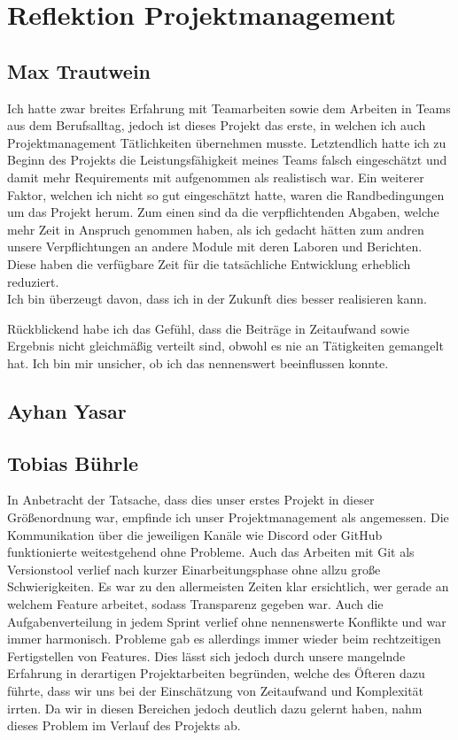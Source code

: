 \chapter{Reflektion Projektmanagement}\label{ch:reflektion-projektmanagement}


\section{Max Trautwein}

Ich hatte zwar breites Erfahrung mit Teamarbeiten sowie dem Arbeiten in Teams aus dem Berufsalltag,
jedoch ist dieses Projekt das erste, in welchen ich auch Projektmanagement Tätlichkeiten übernehmen musste.
Letztendlich hatte ich zu Beginn des Projekts die Leistungsfähigkeit meines Teams falsch eingeschätzt und
damit mehr Requirements mit aufgenommen als realistisch war.
Ein weiterer Faktor, welchen ich nicht so gut eingeschätzt hatte, waren die Randbedingungen um das Projekt herum.
Zum einen sind da die verpflichtenden Abgaben, welche mehr Zeit in Anspruch genommen haben, als ich gedacht hätten
zum andren unsere Verpflichtungen an andere Module mit deren Laboren und Berichten.
Diese haben die verfügbare Zeit für die tatsächliche Entwicklung erheblich reduziert.\\
Ich bin überzeugt davon, dass ich in der Zukunft dies besser realisieren kann.

Rückblickend habe ich das Gefühl, dass die Beiträge in Zeitaufwand sowie Ergebnis nicht gleichmäßig verteilt sind,
obwohl es nie an Tätigkeiten gemangelt hat.
Ich bin mir unsicher, ob ich das nennenswert beeinflussen konnte.

\section{Ayhan Yasar}


\section{Tobias Bührle}
In Anbetracht der Tatsache, dass dies unser erstes Projekt in dieser Größenordnung war,
empfinde ich unser Projektmanagement als angemessen. Die Kommunikation über die jeweiligen
Kanäle wie Discord oder GitHub funktionierte weitestgehend ohne Probleme. Auch das
Arbeiten mit Git als Versionstool verlief nach kurzer Einarbeitungsphase ohne allzu große
Schwierigkeiten. Es war zu den allermeisten Zeiten klar ersichtlich, wer gerade an welchem
Feature arbeitet, sodass Transparenz gegeben war. Auch die Aufgabenverteilung in jedem
Sprint verlief ohne nennenswerte Konflikte und war immer harmonisch. Probleme gab es
allerdings immer wieder beim rechtzeitigen Fertigstellen von Features. Dies lässt sich
jedoch durch unsere mangelnde Erfahrung in derartigen Projektarbeiten begründen, welche
des Öfteren dazu führte, dass wir uns bei der Einschätzung von Zeitaufwand und Komplexität
irrten. Da wir in diesen Bereichen jedoch deutlich dazu gelernt haben, nahm dieses Problem
im Verlauf des Projekts ab.

